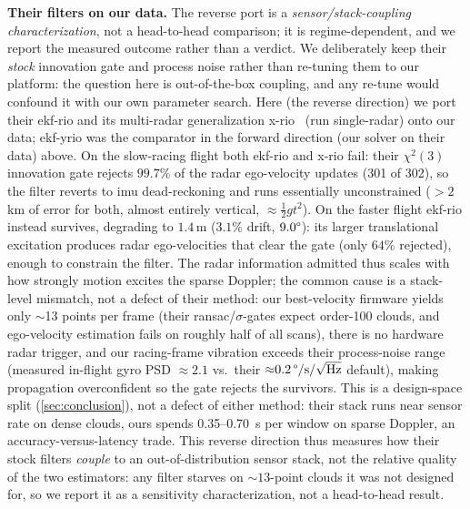 \textbf{Their filters on our data.}  The reverse port is a
\emph{sensor/stack-coupling characterization}, not a head-to-head
comparison; it is regime-dependent, and we report the measured
outcome rather than a verdict.  We deliberately keep their \emph{stock}
innovation gate and process noise rather than re-tuning them to our
platform: the question here is out-of-the-box coupling, and any re-tune
would confound it with our own parameter search.  Here (the reverse direction) we port their ekf-rio and
its multi-radar generalization
x-rio~\cite{doer2021xrio} (run single-radar) onto our data; ekf-yrio was the
comparator in the forward direction (our solver on their data) above.  On the slow-racing flight both ekf-rio
and x-rio fail: their
$\chi^2(3)$ innovation gate rejects $99.7\%$ of the radar ego-velocity
updates (301 of 302), so the filter reverts to \ac{imu} dead-reckoning and
runs essentially unconstrained ($>2$\,km of error for both, almost
entirely vertical, $\approx\tfrac12 g t^2$).  On the faster flight ekf-rio
instead survives, degrading to $1.4$\,m ($3.1\%$ drift,
$9.0\degree$): its larger translational excitation produces radar
ego-velocities that clear the gate (only $64\%$ rejected), enough to
constrain the filter.  The radar information admitted thus
scales with how strongly motion excites the sparse Doppler; the common
cause is a stack-level mismatch, not a defect of their
method: our best-velocity firmware yields only $\sim$13 points per
frame (their \ac{ransac}/$\sigma$-gates expect order-100 clouds, and ego-velocity
estimation fails on roughly half of all scans), there is no hardware radar
trigger, and our racing-frame vibration exceeds their process-noise range
(measured in-flight gyro PSD ${\approx}2.1$ vs.\ their
${\approx}0.2\,\degree/\mathrm{s}/\sqrt{\mathrm{Hz}}$ default),
making propagation overconfident so the gate rejects the survivors.
This is a design-space split (\autoref{sec:conclusion}), not a defect of
either method: their stack runs near sensor rate on dense clouds, ours
spends \SI{0.35}{}--\SI{0.70}{\second} per window on sparse Doppler,
an accuracy-versus-latency trade.
This reverse direction thus measures how their stock filters
\emph{couple} to an out-of-distribution sensor stack, not the relative quality
of the two estimators: any filter starves on ${\sim}13$-point clouds it was not
designed for, so we report it as a sensitivity characterization, not a
head-to-head result.

